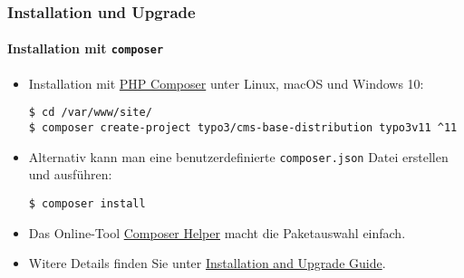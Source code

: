 %

\begin{frame}[fragile]
	\frametitle{Installation und Upgrade}
	\framesubtitle{Installation mit \texttt{composer}}


	\begin{itemize}
		\item Installation mit \href{https://getcomposer.org}{PHP Composer} unter Linux, macOS und Windows 10:
\begin{lstlisting}
$ cd /var/www/site/
$ composer create-project typo3/cms-base-distribution typo3v11 ^11
\end{lstlisting}

		\item Alternativ kann man eine benutzerdefinierte \texttt{composer.json} Datei erstellen und ausführen:
\begin{lstlisting}
$ composer install
\end{lstlisting}

		\item Das Online-Tool \href{https://get.typo3.org/misc/composer/helper}{Composer Helper}
			macht die Paketauswahl einfach.

		\item Witere Details finden Sie unter
			\href{https://docs.typo3.org/m/typo3/guide-installation/master/en-us/}{Installation and Upgrade Guide}.

	\end{itemize}
\end{frame}

